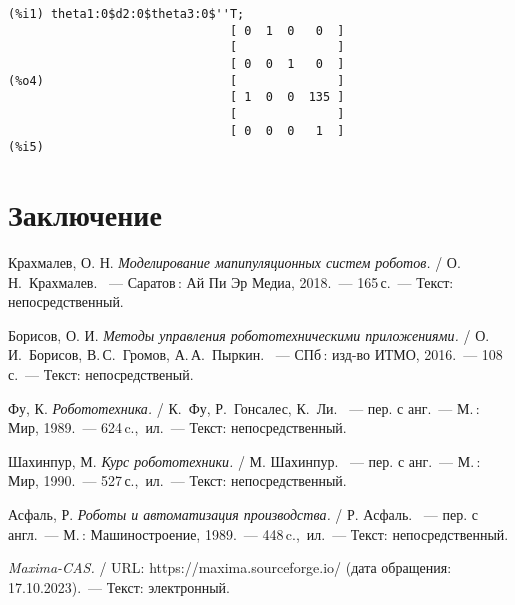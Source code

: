 \documentclass[oneside, final, 14pt]{extarticle}
\begin{document}
{\begin{minipage}{1\textwidth}
{\small
\begin{verbatim}
(%i1) theta1:0$d2:0$theta3:0$''T;
                               [ 0  1  0   0  ]
                               [              ]
                               [ 0  0  1   0  ]
(%o4)                          [              ]
                               [ 1  0  0  135 ]
                               [              ]
                               [ 0  0  0   1  ]
(%i5) 
\end{verbatim}
}
\end{minipage}

\newpage

\section*{Заключение}




\newpage

\begin{thebibliography}{00}

   Крахмалев, О. Н.
  \emph{Моделирование мапипуляционных систем роботов.}
  / О.\,Н.~Крахмалев.
  ~--- Саратов\,: Ай Пи Эр Медиа, 2018.~--- 165\,с.~--- Текст: непосредственный.

   Борисов, О. И.
  \emph{Методы управления робототехническими приложениями.}
  / О.\,И.~Борисов, В.\,С.~Громов, А.\,А.~Пыркин.
  ~--- СПб\,: изд-во ИТМО, 2016.~--- 108\,с.~--- Текст: непосредственый.

   Фу, К.
  \emph{Робототехника.}
  / К.~Фу, Р.~Гонсалес, К.~Ли.
  ~--- пер. с анг.~--- М.\,: Мир, 1989.~--- 624\,c.,~ил.~--- Текст: непосредственный.
  
   Шахинпур, М.
  \emph{Курс робототехники.}
  / М. Шахинпур.
  ~--- пер. с анг.~--- М.\,: Мир, 1990.~--- 527\,с.,~ил.~--- Текст: непосредственный.

   Асфаль, Р.
  \emph{Роботы и автоматизация производства.}
  / Р. Асфаль.
  ~--- пер. с англ.~--- М.\,: Машиностроение, 1989.~--- 448\,c.,~ил.~--- Текст: непосредственный.

  \emph{Maxima-CAS.}
  / URL: {\ttfamily https://maxima.sourceforge.io/}
  (дата обращения: 17.10.2023).~--- Текст: электронный.


\end{thebibliography}}
\end{document}

